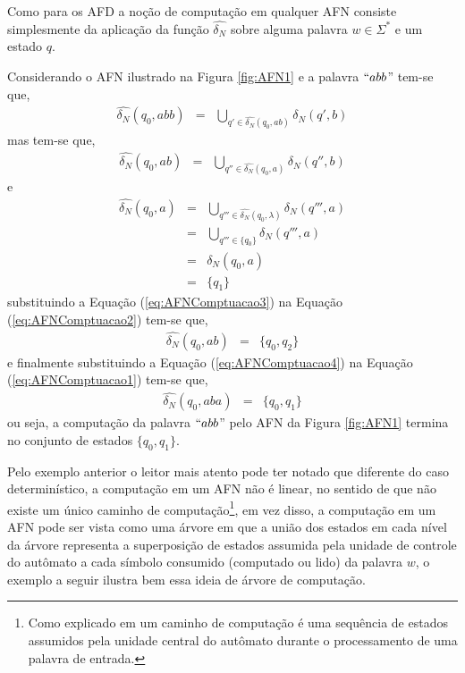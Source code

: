Como para os AFD a noção de computação em qualquer AFN consiste simplesmente da aplicação da função $\widehat{\delta_N}$ sobre alguma palavra $w \in \Sigma^*$ e um estado $q$. 

\begin{exem}\label{exe:ComputacaoAFN}
	Considerando o AFN ilustrado na Figura \ref{fig:AFN1} e a palavra $``abb$'' tem-se que,
	\begin{eqnarray}\label{eq:AFNComptuacao1}
		\widehat{\delta_N}(q_0, abb) & = & \bigcup_{q' \in \widehat{\delta_N}(q_0, ab)} \delta_N(q', b)
	\end{eqnarray}
	mas tem-se que, 
	\begin{eqnarray}\label{eq:AFNComptuacao2}
		 \widehat{\delta_N}(q_0, ab) & = & \bigcup_{q'' \in \widehat{\delta_N}(q_0, a)} \delta_N(q'', b)
	\end{eqnarray}
	e
	\begin{eqnarray}\label{eq:AFNComptuacao3}
		\widehat{\delta_N}(q_0, a) & = & \bigcup_{q''' \in \widehat{\delta_N}(q_0, \lambda)} \delta_N(q''', a) \nonumber \\ 
		& = & \bigcup_{q''' \in \{q_0\}} \delta_N(q''', a) \\
		& = & \delta_N(q_0, a) \nonumber \\ 
		& = & \{q_1\} \nonumber
	\end{eqnarray}
	substituindo a Equação (\ref{eq:AFNComptuacao3}) na Equação (\ref{eq:AFNComptuacao2}) tem-se que, 
	\begin{eqnarray}\label{eq:AFNComptuacao4}
		\widehat{\delta_N}(q_0, ab) & = & \{q_0, q_2\}
	\end{eqnarray}
	e finalmente substituindo a Equação (\ref{eq:AFNComptuacao4}) na Equação (\ref{eq:AFNComptuacao1}) tem-se que,
	 \begin{eqnarray}
	 	\widehat{\delta_N}(q_0, aba) & = & \{q_0, q_1\}
	 \end{eqnarray}
 	ou seja, a computação da palavra $``abb$'' pelo AFN da Figura \ref{fig:AFN1} termina no conjunto de estados $\{q_0, q_1\}$.
\end{exem}


Pelo exemplo anterior o leitor mais atento pode ter notado que diferente do caso determinístico, a computação em um AFN não é linear, no sentido de que não existe um único caminho de computação\footnote{Como explicado em \cite{valdi2020phd} um caminho de computação é uma sequência de estados assumidos pela unidade central do autômato durante o processamento de uma palavra de entrada.}, em vez disso, a computação em um AFN pode ser vista como uma árvore em que a união dos estados em cada nível da árvore representa a superposição de estados assumida pela unidade de controle do autômato a cada símbolo consumido (computado ou lido) da palavra $w$, o exemplo a seguir ilustra bem essa ideia de árvore de computação.

